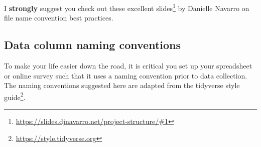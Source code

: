 \documentclass[
]{krantz}
\renewcommand{\href}[2]{#2\footnote{\url{#1}}}
\begin{document}
I \textbf{strongly} suggest you check out these excellent \href{https://slides.djnavarro.net/project-structure/\#1}{slides} by Danielle Navarro on file name convention best practices.

\hypertarget{data-column-naming-conventions}{%
\subsection{Data column naming conventions}\label{data-column-naming-conventions}}

To make your life easier down the road, it is critical you set up your spreadsheet or online survey such that it uses a naming convention prior to data collection. The naming conventions suggested here are adapted from the tidyverse \href{https://style.tidyverse.org}{style guide}.
\end{document}
